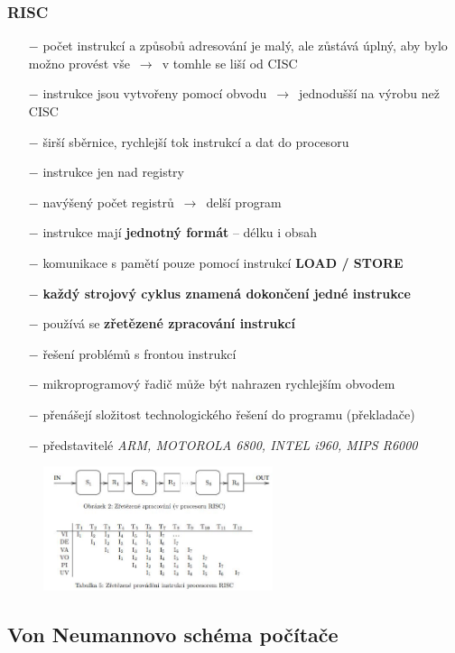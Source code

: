 \subsubsection{RISC}
\begin{itemize}
\item[$-$]{počet instrukcí a způsobů adresování je malý, ale zůstává úplný, aby bylo možno provést vše $\,\to\,$ v tomhle se liší od CISC}
\item[$-$]{instrukce jsou vytvořeny pomocí obvodu $\,\to\,$ jednodušší na výrobu než CISC}
\item[$-$]{širší sběrnice, rychlejší tok instrukcí a dat do procesoru}
\item[$-$]{instrukce jen nad registry}
\item[$-$]{navýšený počet registrů $\,\to\,$ delší program}
\item[$-$]{instrukce mají \textbf{jednotný formát} -- délku i obsah}
\item[$-$]{komunikace s pamětí pouze pomocí instrukcí \textbf{LOAD / STORE}}
\item[$-$]{\textbf{každý strojový cyklus znamená dokončení jedné instrukce}}
\item[$-$]{používá se \textbf{zřetězené zpracování instrukcí}}
\item[$-$]{řešení problémů s frontou instrukcí}
\item[$-$]{mikroprogramový řadič může být nahrazen rychlejším obvodem}
\item[$-$]{přenášejí složitost technologického řešení do programu (překladače)}
\item[$-$]{představitelé \textit{ARM, MOTOROLA 6800, INTEL i960, MIPS R6000}}
\end{itemize}
\begin{figure}[H]
\centering
\includegraphics[width=0.6\textwidth]{assets/1_risc_zretezeni}
\end{figure}

\subsection{Von Neumannovo schéma počítače}

